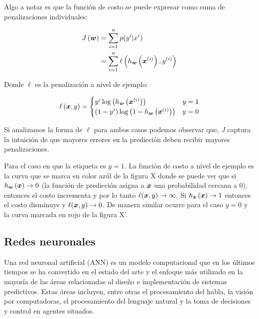 Algo a notar es que la función de costo se puede expresar como suma de penalizaciones
individuales:

\begin{align}
    J\left( \boldsymbol{w} \right) &= \sum_{i=1}^{n} p(y^{i} | x^{i}) \\
                             &= \sum_{i=1}^{n} \ell\left( h_{\boldsymbol{w}}\left( \boldsymbol{x}^{(i)}\right), y^{(i)}\right)
\end{align}

Donde $\ell$ es la penalización a nivel de ejemplo:

\begin{align}
    \ell\left( \boldsymbol{x}, y \right) =
    \begin{cases}
        y^{i}\log\left( h_{\boldsymbol{w}}\left( \boldsymbol{x}^{(i)} \right) \right) & y = 1 \\
        (1 - y^{i})\log\left(1 - h_{\boldsymbol{w}}\left( \boldsymbol{x}^{(i)} \right) \right) & y = 0
    \end{cases}
\end{align}

Si analizamos la forma de $\ell$ para ambos casos podemos observar que, $J$
captura la intuición de que mayores errores en la predicción deben recibir
mayores penalizaciones.

Para el caso en que la etiqueta es $y = 1$. La función de costo a nivel de
ejemplo es la curva que se marca en color azúl de la figura X donde se puede ver
que si $h_{\boldsymbol{w}}\left( \boldsymbol{x} \right) \rightarrow 0$ (la función de
predicción asigna a $\boldsymbol{x}$ una probabilidad cercana a $0$), entonces el
costo incrementa y por lo tanto $\ell(\boldsymbol{x}, y) \rightarrow \infty$. Si
$h_{\boldsymbol{x}}\left( \boldsymbol{x} \right) \rightarrow 1$ entonces el costo disminuye
y $\ell(\boldsymbol{x}, y) \rightarrow 0$. De manera similar ocurre para el caso $y =
0$ y la curva marcada en rojo de la figura X'.

\subsection{Redes neuronales}

Una red neuronal artificial (ANN) es un modelo computacional que en los últimos
tiempos se ha convertido en el estado del arte y el enfoque más utilizado en la
mayoría de las áreas relacionadas al diseño e implementación de sistemas
predictivos. Estas áreas incluyen, entre otras el procesamiento del habla, la
visión por computadoras, el procesamiento del lenguaje natural y la toma de
decisiones y control en agentes situados.

